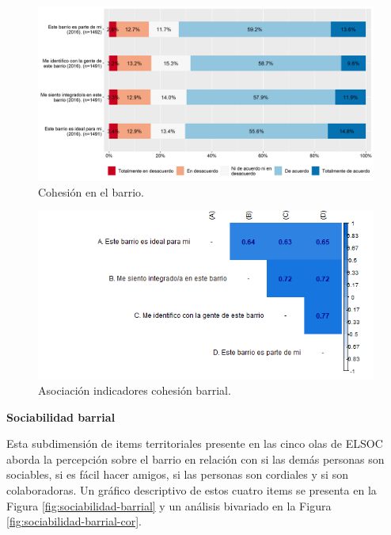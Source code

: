 \documentclass[
  12pt,
]{book}
\begin{document}
\begin{figure}[H]

{\centering \includegraphics[width=1\linewidth,height=1\textheight]{output/graphs/cohesion-barrial} 

}

\caption{Cohesión en el barrio.}\label{fig:cohesion-barrial}
\end{figure}

\begin{figure}[H]

{\centering \includegraphics[width=1\linewidth,height=1\textheight]{output/graphs/cohesion-barrial_cor} 

}

\caption{Asociación indicadores cohesión barrial.}\label{fig:cohesion-barrial-cor}
\end{figure}

\textbf{Sociabilidad barrial}

Esta subdimensión de items territoriales presente en las cinco olas de ELSOC aborda la percepción sobre el barrio en relación con si las demás personas son sociables, si es fácil hacer amigos, si las personas son cordiales y si son colaboradoras. Un gráfico descriptivo de estos cuatro items se presenta en la Figura \ref{fig:sociabilidad-barrial} y un análisis bivariado en la Figura \ref{fig:sociabilidad-barrial-cor}.
\end{document}
